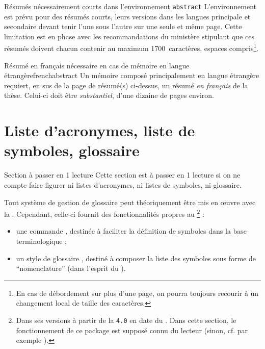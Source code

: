 \begin{dbwarning}{Résumés nécessairement courts dans l'environnement
    \protect\lstinline+abstract+}{}
  L'environnement  est prévu pour des résumés courts, leurs
  versions dans les langues principale et secondaire devant tenir l'une sous
  l'autre sur une seule et même page. Cette limitation est en phase avec les
  recommandations du ministère stipulant que ces résumés doivent chacun
  contenir au maximum 1700~caractères, espaces compris\footnote{En cas de
    débordement sur plus d'une page, on pourra toujours recourir à un
    changement local de taille des caractères.}.
\end{dbwarning}

\begin{dbwarning}{Résumé en français nécessaire en cas de mémoire en langue
    étrangère}{frenchabstract}
  Un mémoire composé principalement en langue étrangère  requiert, en sus de la page de
  résumé(s) ci-dessus, un résumé \emph{en français} de la thèse. Celui-ci doit
  être \emph{substantiel}, d'une dizaine de pages environ.
\end{dbwarning}

\section{Liste d'acronymes, liste de symboles,
  glossaire}\label{sec-sigl-gloss-nomencl}
%
%
%

\begin{dbremark*}{Section à passer en 1\iere{} lecture}
  Cette section est à passer en 1\iere{} lecture si on ne compte faire figurer
  ni listes d'acronymes, ni listes de symboles, ni glossaire.
\end{dbremark*}

Tout système de gestion de glossaire peut théoriquement être mis en œuvre avec
la \yatCl. Cependant, celle-ci fournit des fonctionnalités propres au
\footnote{Dans ses versions à partir de la \texttt{4.0} en
  date du . Dans cette section, le fonctionnement de
  ce package est supposé connu du lecteur (sinon, cf. par exemple
  \cite{en-ligne7}).} :
\begin{itemize}
\item une commande , destinée à faciliter la définition de
  symboles dans la base terminologique ;
\item un style de glossaire , destiné à composer la
  liste des symboles sous forme de \enquote{nomenclature} (dans l'esprit du
  ).
\end{itemize}

